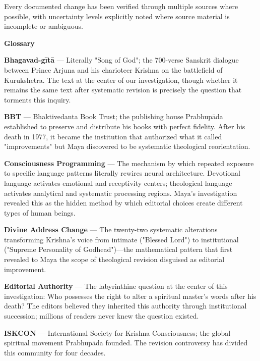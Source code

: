 \documentclass[12pt,twoside]{book}
\begin{document}
Every documented change has been verified through multiple sources where possible, with uncertainty levels explicitly noted where source material is incomplete or ambiguous.

\clearpage
\pagestyle{sectionopening}
\thispagestyle{sectionopening}
\markboth{}{}
\markright{}
\vspace*{0.25\textheight}
\begin{center}
{\Huge\bfseries Glossary}
\end{center}
\newpage

\textbf{\textbf{Bhagavad-gītā}} — Literally "Song of God"; the 700-verse Sanskrit dialogue between Prince Arjuna and his charioteer Krishna on the battlefield of Kurukshetra. The text at the center of our investigation, though whether it remains the same text after systematic revision is precisely the question that torments this inquiry.

\textbf{\textbf{BBT}} — Bhaktivedanta Book Trust; the publishing house Prabhupāda established to preserve and distribute his books with perfect fidelity. After his death in 1977, it became the institution that authorized what it called "improvements" but Maya discovered to be systematic theological reorientation.

\textbf{\textbf{Consciousness Programming}} — The mechanism by which repeated exposure to specific language patterns literally rewires neural architecture. Devotional language activates emotional and receptivity centers; theological language activates analytical and systematic processing regions. Maya's investigation revealed this as the hidden method by which editorial choices create different types of human beings.

\textbf{\textbf{Divine Address Change}} — The twenty-two systematic alterations transforming Krishna's voice from intimate ("Blessed Lord") to institutional ("Supreme Personality of Godhead")—the mathematical pattern that first revealed to Maya the scope of theological revision disguised as editorial improvement.

\textbf{\textbf{Editorial Authority}} — The labyrinthine question at the center of this investigation: Who possesses the right to alter a spiritual master's words after his death? The editors believed they inherited this authority through institutional succession; millions of readers never knew the question existed.

\textbf{\textbf{ISKCON}} — International Society for Krishna Consciousness; the global spiritual movement Prabhupāda founded. The revision controversy has divided this community for four decades.
\end{document}
